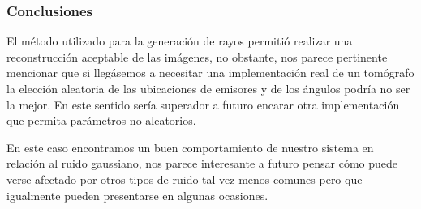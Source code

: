 \subsubsection*{Conclusiones}


\par El método utilizado para la generación de rayos permitió realizar una reconstrucción aceptable de las imágenes, no obstante, nos parece pertinente mencionar que si llegásemos a necesitar una implementación real de un tomógrafo la elección aleatoria de las ubicaciones de emisores y de los ángulos podría no ser la mejor. En este sentido sería superador a futuro encarar otra implementación que permita parámetros no aleatorios.
\par En este caso encontramos un buen comportamiento de nuestro sistema en relación al ruido gaussiano, nos parece interesante a futuro pensar cómo puede verse afectado por otros tipos de ruido tal vez menos comunes pero que igualmente pueden presentarse en algunas ocasiones. 



